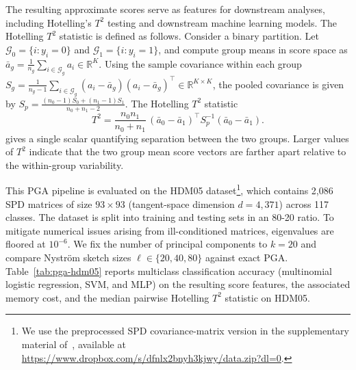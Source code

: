 \documentclass[final,onefignum,onetabnum]{siamart250211}
\begin{document}
The resulting approximate scores serve as features for downstream analyses, including Hotelling's $T^2$ testing and downstream machine learning models.
The Hotelling $T^2$ statistic is defined as follows.
Consider a binary partition. Let $\mathcal{G}_0=\{i: y_i=0\}$ and $\mathcal{G}_1=\{i: y_i=1\}$, and compute group means in score space as $\bar a_g = \frac{1}{n_g}\sum_{i\in\mathcal{G}_g} a_i \in \mathbb{R}^K$. Using the sample covariance within each group $S_g = \frac{1}{n_g-1}\sum_{i\in\mathcal{G}_g} (a_i-\bar a_g)(a_i-\bar a_g)^\top \in \mathbb{R}^{K\times K}$,
the pooled covariance is given by
$ 
S_p = \frac{(n_0-1)S_0 + (n_1-1)S_1}{n_0+n_1-2}.
$
The Hotelling $T^2$ statistic~\cite{Hotelling1931}
\[
T^2 = \frac{n_0 n_1}{n_0+n_1}\,(\bar a_0-\bar a_1)^\top S_p^{-1}(\bar a_0-\bar a_1) .
\]
gives a single scalar quantifying separation between the two groups.
Larger values of $T^2$ indicate that the two group mean score vectors are farther apart relative to the within-group variability.


This PGA pipeline is evaluated on the HDM05 dataset\footnote{We use the preprocessed SPD covariance-matrix version in the supplementary material of~\cite{brooks2019riemannian}, available at \url{https://www.dropbox.com/s/dfnlx2bnyh3kjwy/data.zip?dl=0}.}, which contains 2,086 SPD matrices of size $93\times 93$ (tangent-space dimension $d=4{,}371$) across 117 classes. The dataset is split into training and testing sets in an 80-20 ratio. To mitigate numerical issues arising from ill-conditioned matrices, eigenvalues are floored at $10^{-6}$. We fix the number of principal components to $k=20$ and compare Nystr\"om sketch sizes $\ell\in\{20,40,80\}$ against exact PGA. Table~\ref{tab:pga-hdm05} reports multiclass classification accuracy (multinomial logistic regression, SVM, and MLP) on the resulting score features, the associated memory cost, and the median pairwise Hotelling $T^2$ statistic on HDM05.
\end{document}
